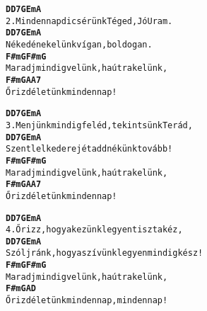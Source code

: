 \cleardoublepage
{}
\kottastart
{}
\kottaend
\begin{minipage}{\textwidth}
\begin{alltt}
\textbf{    D      D7     G      Em         A}
2. Minden nap dicsérünk Téged, Jó Uram.
\textbf{    D    D7    G    Em          A}
   Néked énekelünk vígan, boldogan.
\textbf{    F#m           G       F#m     G}
   Maradj mindig velünk, ha útra kelünk,
\textbf{   F#m       G           A  A7}
   Őrizd életünk minden nap!
\end{alltt}
\vspace{0.0cm}
\versszakspacing
\end{minipage}
\begin{minipage}{\textwidth}
\begin{alltt}
\textbf{    D       D7     G      Em         A}
3. Menjünk mindig feléd, tekintsünk Terád,
\textbf{     D      D7     G  Em            A}
   Szentlelked erejét add nékünk tovább!
\textbf{    F#m            G       F#m     G}
   Maradj  mindig velünk, ha útra kelünk,
\textbf{   F#m       G           A  A7}
   Őrizd életünk minden nap!
\end{alltt}
\vspace{0.0cm}
\versszakspacing
\end{minipage}
\begin{minipage}{\textwidth}
\begin{alltt}
\textbf{   D       D7     G      Em            A}
4. Őrizz, hogy a kezünk legyen tiszta kéz,
\textbf{     D          D7      G      Em            A}
   Szólj ránk, hogy a szívünk legyen mindig kész!
\textbf{    F#m           G       F#m     G}
   Maradj mindig velünk, ha útra kelünk,
\textbf{   F#m       G           A           D}
   Őrizd életünk minden nap, minden nap!
\end{alltt}
\vspace{0.0cm}
\versszakspacing
\end{minipage}
~\vspace{1.0cm}
\newline

